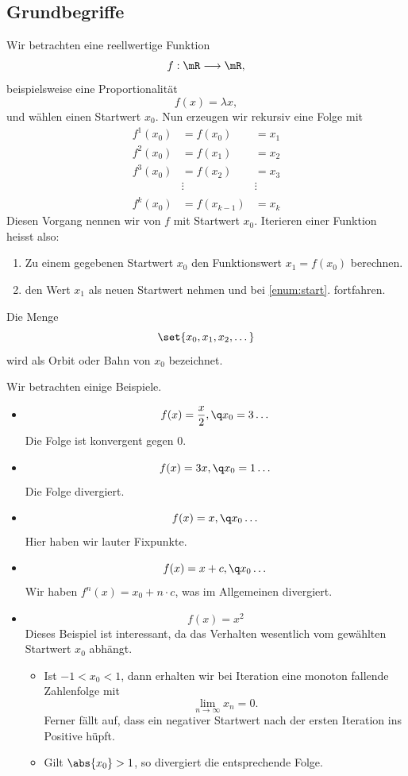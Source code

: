 \documentclass[%
<<<<<<< Updated upstream
11pt,%
twoside,%
titlepage,%
german,%
headsepline%
]{scrartcl}
\begin{document}
\subsection{Grundbegriffe}

Wir betrachten eine reellwertige Funktion
$$f:\mR\longrightarrow\mR,$$
beispielsweise eine Proportionalität
$$f(x)=\lambda x,$$
und wählen einen Startwert $x_0$. Nun erzeugen wir rekursiv eine Folge mit
\begin{align*}
f^1(x_0) &= f(x_0) &= x_1\\
f^2(x_0) &= f(x_1) &= x_2\\
f^3(x_0) &= f(x_2) &= x_3\\
&\vdots &\vdots \phantom{x_k} \\
f^k(x_0) &= f(x_{k-1}) &= x_k
\end{align*}
Diesen
Vorgang nennen wir  von $f$ mit Startwert $x_0$. Iterieren einer Funktion heisst also:
\begin{enumerate}
\item\label{enum:start} Zu einem gegebenen Startwert $x_0$ den Funktionswert $x_1=f(x_0)$ berechnen.
\item den Wert $x_1$ als neuen Startwert nehmen und bei \ref{enum:start}. fortfahren.
\end{enumerate}
\begin{cdef}[Orbit]
Die Menge
$$\set{x_0,x_1,x_2,\dots}$$
wird als Orbit oder Bahn von $x_0$ bezeichnet.
\end{cdef}
\begin{bsps}
Wir betrachten einige Beispiele.
\begin{itemize}
\item $$f(x)=\frac{x}{2},\q x_0=3\dots$$ Die Folge ist konvergent gegen $0$.
\item $$f(x)=3x,\q x_0=1\dots$$ Die Folge divergiert.
\item $$f(x)=x,\q x_0\dots$$ Hier haben wir lauter Fixpunkte.
\item $$f(x)=x+c,\q x_0\dots$$ Wir haben $f^n(x)=x_0+n\cdot c$, was im Allgemeinen divergiert.
\item $$f(x)=x^2$$ Dieses Beispiel ist interessant, da das Verhalten wesentlich vom gewählten Startwert $x_0$ abhängt.
\begin{itemize}
\item Ist $-1<x_0<1$, dann erhalten wir bei Iteration eine monoton fallende Zahlenfolge mit
$$\lim_{n\to\infty}x_n=0.$$ Ferner fällt auf, dass ein negativer Startwert nach der ersten Iteration \glqq ins Positive hüpft\grqq.
\item Gilt $\abs{x_0}>1$, so divergiert die entsprechende Folge.
\end{itemize}
\end{itemize}
\end{bsps}
\end{document}

